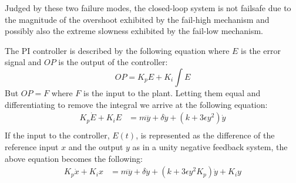 Judged by these two failure modes, the closed-loop system is not failsafe due to the magnitude of the overshoot exhibited by the fail-high mechanism and possibly also the extreme slowness exhibited by the fail-low mechanism.



The PI controller is described by the following equation where $E$ is the error signal and $OP$ is the output of the controller:
\begin{equation*}
	OP = K_p E + K_i\int E
\end{equation*}
But $OP=F$ where $F$ is the input to the plant. Letting them equal and differentiating to remove the integral we arrive at the following equation:
\begin{align*}
	K_p\dot{E} + K_i E&= m \dddot{y} + \delta \ddot{y} + (k + 3\epsilon y^2)\dot{y}\\
\end{align*}
If the input to the controller, $E(t)$, is represented as the difference of the reference input $x$ and the output $y$ as in a unity negative feedback system, the above equation becomes the following:
\begin{align*}
	K_p\dot{x} + K_i x&= m \dddot{y} + \delta \ddot{y} + (k + 3\epsilon y^2 K_p)\dot{y} + K_i y\\
\end{align*}
